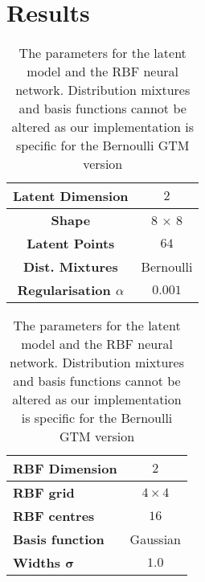 \chapter{Results}

\begin{table}[H]
	\centering
	\begin{tabular}{|c|c|} \hline
		\textbf{Latent Dimension} & $2$ \\ \hline
		\textbf{Shape} & 8 $\times$ $8$ \\ \hline
		\textbf{Latent Points} &  $64$\\ \hline
		\textbf{Dist. Mixtures} &  Bernoulli\\ \hline \hline
		\textbf{Regularisation $\alpha$ } & $0.001$ \\ \hline
	\end{tabular}
	\hspace*{0.5cm}
	\begin{tabular}{|l|c|} \hline
		\textbf{RBF Dimension} & $2$ \\ \hline
		\textbf{RBF grid}  & $4\times4$ \\ \hline 
		\textbf{RBF centres} & $16$ \\ \hline
		\textbf{Basis function} & Gaussian \\ \hline
	    \textbf{Widths $\bm{\sigma}$} & $1.0$\\ \hline
	\end{tabular}
	\caption{The parameters for the latent model and the RBF neural network. Distribution mixtures and basis functions cannot be altered as our implementation is specific for the Bernoulli GTM version}
	\label{eval:model}
\end{table}




